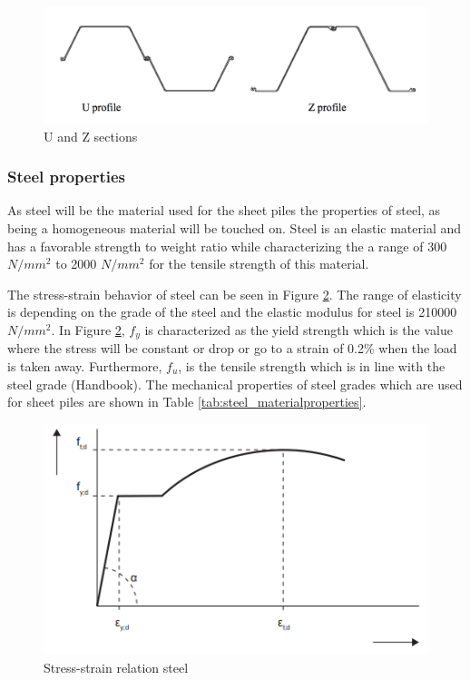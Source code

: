 
\begin{figure}[H]
    \centering
    \includegraphics[width=0.50\linewidth]{figures/ch8/u_profile_z_profile.png}
    \caption{U and Z sections}
    \label{fig:sections_sheetpiles}
\end{figure}

\subsubsection{Steel properties}

As steel will be the material used for the sheet piles the properties of steel, as being a homogeneous material will be touched on. Steel is an elastic material and has a favorable strength to weight ratio while characterizing the a range of 300 $N/mm^{2}$ to 2000 $N/mm^{2}$ for the tensile strength of this material. 

The stress-strain behavior of steel can be seen in Figure \ref{fig:stress_strain_steel}. The range of elasticity is depending on the grade of the steel and the elastic modulus for steel is 210000 $N/mm^{2}$. In Figure \ref{fig:stress_strain_steel}, $f_{y}$ is characterized as the yield strength which is the value where the stress will be constant or drop or go to a strain of 0.2\% when the load is taken away. Furthermore, $f_{u}$, is the tensile strength which is in line with the steel grade (Handbook). The mechanical properties of steel grades which are used for sheet piles are shown in Table \ref{tab:steel_materialproperties}.


\begin{figure}[H]
    \centering
    \includegraphics[width=0.50\linewidth]{figures/ch8/stress_strain_steel.png}
    \caption{Stress-strain relation steel}
    \label{fig:stress_strain_steel}
\end{figure}

